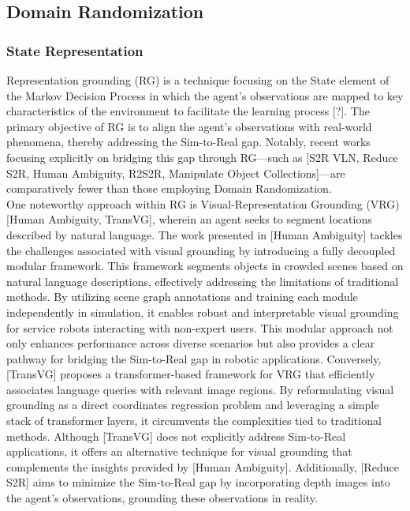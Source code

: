 \subsection{Domain Randomization}




\subsubsection{State Representation}
Representation grounding (RG) is a technique focusing on the State element of the Markov Decision Process in which the agent’s observations are mapped to key characteristics of the environment to facilitate the learning process [?]. The primary objective of RG is to align the agent's observations with real-world phenomena, thereby addressing the Sim-to-Real gap. Notably, recent works focusing explicitly on bridging this gap through RG—such as [S2R VLN, Reduce S2R, Human Ambiguity, R2S2R, Manipulate Object Collections]—are comparatively fewer than those employing Domain Randomization.
\\

One noteworthy approach within RG is Visual-Representation Grounding (VRG) [Human Ambiguity, TransVG], wherein an agent seeks to segment locations described by natural language. The work presented in [Human Ambiguity] tackles the challenges associated with visual grounding by introducing a fully decoupled modular framework. This framework segments objects in crowded scenes based on natural language descriptions, effectively addressing the limitations of traditional methods. By utilizing scene graph annotations and training each module independently in simulation, it enables robust and interpretable visual grounding for service robots interacting with non-expert users. This modular approach not only enhances performance across diverse scenarios but also provides a clear pathway for bridging the Sim-to-Real gap in robotic applications. Conversely, [TransVG] proposes a transformer-based framework for VRG that efficiently associates language queries with relevant image regions. By reformulating visual grounding as a direct coordinates regression problem and leveraging a simple stack of transformer layers, it circumvents the complexities tied to traditional methods. Although [TransVG] does not explicitly address Sim-to-Real applications, it offers an alternative technique for visual grounding that complements the insights provided by [Human Ambiguity]. Additionally, [Reduce S2R] aims to minimize the Sim-to-Real gap by incorporating depth images into the agent's observations, grounding these observations in reality.
\\

